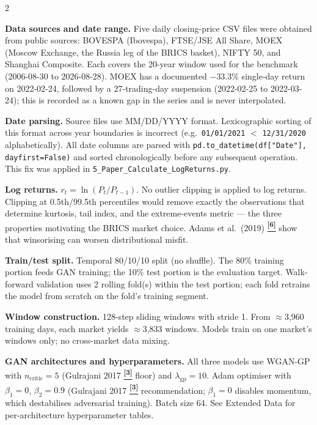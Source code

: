 \documentclass[10pt]{article}
\newcommand{\tcite}[1]{%
  \hyperlink{R:#1}{\textsuperscript{\scriptsize\textbf{[#1]}}}}
\begin{document}
\begin{multicols}{2}
\small

\textbf{Data sources and date range.}
Five daily closing-price CSV files were obtained from public sources: BOVESPA (Ibovespa), FTSE/JSE All Share, MOEX (Moscow Exchange, the Russia leg of the BRICS basket), NIFTY 50, and Shanghai Composite. Each covers the 20-year window used for the benchmark (2006-08-30 to 2026-08-28). MOEX has a documented $-33.3\%$ single-day return on 2022-02-24, followed by a 27-trading-day suspension (2022-02-25 to 2022-03-24); this is recorded as a known gap in the series and is never interpolated.

\textbf{Date parsing.}
Source files use MM/DD/YYYY format. Lexicographic sorting of this format across year boundaries is incorrect (e.g.\ \texttt{01/01/2021} $<$ \texttt{12/31/2020} alphabetically). All date columns are parsed with \texttt{pd.to\_datetime(df["Date"], dayfirst=False)} and sorted chronologically before any subsequent operation. This fix was applied in \texttt{5\_Paper\_Calculate\_LogReturns.py}.

\textbf{Log returns.}
$r_t = \ln(P_t / P_{t-1})$. No outlier clipping is applied to log returns. Clipping at 0.5th/99.5th percentiles would remove exactly the observations that determine kurtosis, tail index, and the extreme-events metric --- the three properties motivating the BRICS market choice. Adams et al.\ (2019)\tcite{6} show that winsorising can worsen distributional misfit.

\textbf{Train/test split.}
Temporal 80/10/10 split (no shuffle). The 80\% training portion feeds GAN training; the 10\% test portion is the evaluation target. Walk-forward validation uses 2 rolling fold(s) within the test portion; each fold retrains the model from scratch on the fold's training segment.

\textbf{Window construction.}
128-step sliding windows with stride 1. From $\approx$3{,}960 training days, each market yields $\approx$3{,}833 windows. Models train on one market's windows only; no cross-market data mixing.

\textbf{GAN architectures and hyperparameters.}
All three models use WGAN-GP with $n_\text{critic}=5$ (Gulrajani 2017\tcite{3} floor) and $\lambda_\text{gp}=10$. Adam optimiser with $\beta_1=0$, $\beta_2=0.9$ (Gulrajani 2017\tcite{3} recommendation; $\beta_1=0$ disables momentum, which destabilises adversarial training). Batch size 64. See Extended Data for per-architecture hyperparameter tables.


\end{multicols}
\end{document}
